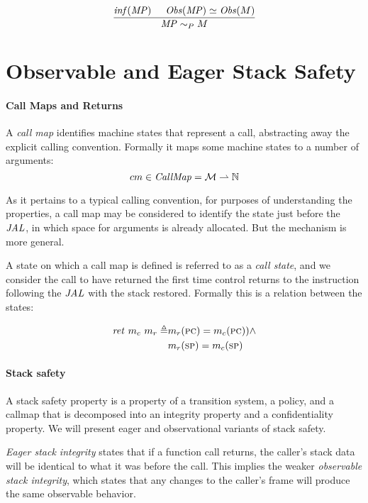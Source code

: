 \documentclass[conference]{IEEEtran}
\begin{document}
    \[\frac{\mathit{inf}(\mathit{MP}) \hspace{.5cm} \mathit{Obs}(\mathit{MP}) \simeq \mathit{Obs}(M)}
           {\mathit{MP} \sim_P M}\]
  
  \section{Observable and Eager Stack Safety}

    \paragraph*{Call Maps and Returns}

    A {\it call map} identifies machine states that represent a call, abstracting away the explicit
    calling convention. Formally it maps some machine states to a number of arguments:
    \[cm \in \mathit{CallMap} = {\mathcal M} \rightharpoonup \mathbb{N}\]

    As it pertains to a typical calling convention, for purposes of understanding the properties,
    a call map may be considered to identify the state just before the \(\mathit{JAL}\), in which space for
    arguments is already allocated. But the mechanism is more general.

    A state on which a call map is defined is referred to as a {\it call state}, and we consider
    the call to have returned the first time control returns to the instruction following the
    \(\mathit{JAL}\) with the stack restored. Formally this is a relation between the states:
    
    \[\begin{split}
      \ret{\mach_c}\ \mach_r \triangleq & \mach_r(\PCname) = \next(\mach_c(\PCname)) \land \\
                                        & \mach_r(\SP) = \mach_c(\SP)
    \end{split}\]

    
    \paragraph*{Stack safety}
  
    A stack safety property is a property of a transition system, a policy, and a callmap
    that is decomposed into an integrity property and a confidentiality property.
    We will present eager and observational variants of stack safety.

    {\it Eager stack integrity} states that if a function call returns, the caller's stack data
    will be identical to what it was before the call. This implies the weaker {\it observable
    stack integrity}, which states that any changes to the caller's frame will produce the same
    observable behavior.
\end{document}
